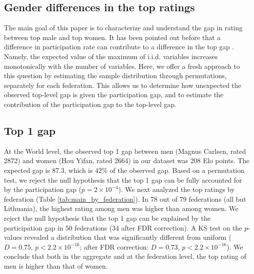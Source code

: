 \documentclass[9pt,twocolumn,twoside,lineno]{pnas-new}
\begin{document}
\subsection*{Gender differences in the top ratings}
The main goal of this paper is to characterize and understand the gap in rating between top male and top women. It has been pointed out before that a difference in participation rate can contribute to a difference in the top gap \cite{charness1996participation, chabris2006sex, bilalic2009best}. Namely, the expected value of the maximum of i.i.d. variables  increases monotonically with the number of variables. Here, we offer a fresh approach to this question by estimating the sample distribution through permutations, separately for each federation. This allows us to determine how unexpected the observed top-level gap is given the participation gap, and to estimate the contribution of the participation gap to the top-level gap. 

\subsection*{Top 1 gap}
 At the World level, the observed top 1 gap between men (Magnus Carlsen, rated 2872) and women (Hou Yifan, rated 2664) in our dataset was 208 Elo points. The expected gap is 87.3, which is $42\%$ of the observed gap. Based on a permutation test, we reject the null hypothesis that the top 1 gap can be fully accounted for by the participation gap ($p=2\times 10^{-4}$).  We next analyzed the top ratings by federation (Table \ref{tab:main_by_federation}). In 78 out of 79 federations (all but Lithuania), the highest rating among men was higher than among women. We reject the null hypothesis that the top 1 gap can be explained by the participation gap in 50 federations (34 after FDR correction). A KS test on the $p$-values revealed a distribution that was significantly different from uniform ($D=0.75$, $p < 2.2\times 10^{-16}$; after FDR correction: $D=0.73$, $p < 2.2\times 10^{-16}$). We conclude that both in the aggregate and at the federation level, the top rating of men is higher than that of women. 
\end{document}
